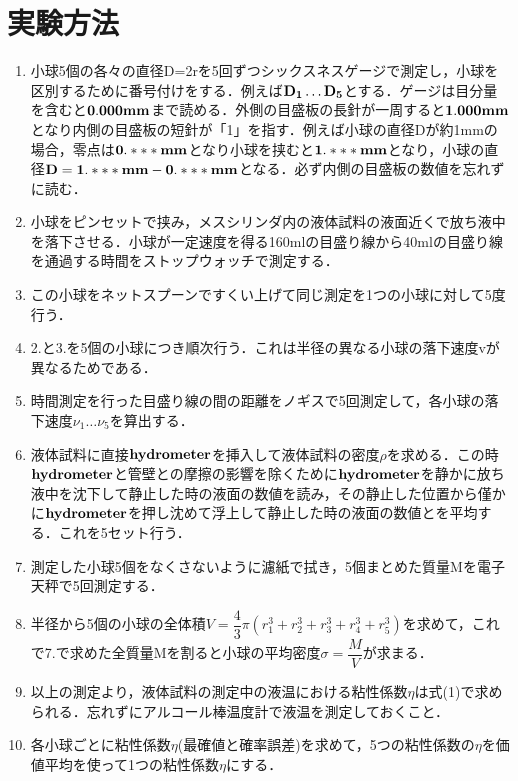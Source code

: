 \documentclass[a4paper,1pt]{jsarticle}
\begin{document}
\section{実験方法}



\begin{enumerate}
  \item 小球5個の各々の直径D=2rを5回ずつシックスネスゲージで測定し，小球を区別するために番号付けをする．例えば$\bold{D_1\dots D_5}$とする．ゲージは目分量を含むと$\bold{0.000mm}$まで読める．外側の目盛板の長針が一周すると$\bold{1.000mm}$となり内側の目盛板の短針が「1」を指す．例えば小球の直径Dが約1mmの場合，零点は$\bold{0.\ast \ast \ast mm}$となり小球を挟むと$\bold{1.\ast \ast \ast mm}$となり，小球の直径$\bold{D=1.\ast \ast \ast mm - 0.\ast \ast \ast mm}$となる．必ず内側の目盛板の数値を忘れずに読む．
  \item 小球をピンセットで挟み，メスシリンダ内の液体試料の液面近くで放ち液中を落下させる．小球が一定速度を得る160mlの目盛り線から40mlの目盛り線を通過する時間をストップウォッチで測定する．
  \item この小球をネットスプーンですくい上げて同じ測定を1つの小球に対して5度行う．
  \item 2.と3.を5個の小球につき順次行う．これは半径の異なる小球の落下速度vが異なるためである．
  \item 時間測定を行った目盛り線の間の距離をノギスで5回測定して，各小球の落下速度$\nu _1\dots \nu _5$を算出する．
  \item 液体試料に直接$\bold{hydrometer}$を挿入して液体試料の密度$\rho $を求める．この時$\bold{hydrometer}$と管壁との摩擦の影響を除くために$\bold{hydrometer}$を静かに放ち液中を沈下して静止した時の液面の数値を読み，その静止した位置から僅かに$\bold{hydrometer}$を押し沈めて浮上して静止した時の液面の数値とを平均する．これを5セット行う．
  \item 測定した小球5個をなくさないように濾紙で拭き，5個まとめた質量Mを電子天秤で5回測定する．
  \item 半径から5個の小球の全体積$V=\dfrac{4}{3}\pi (r_1^3+r_2^3+r_3^3+r_4^3+r_5^3)$を求めて，これで7.で求めた全質量Mを割ると小球の平均密度$\sigma = \dfrac{M}{V}$が求まる．
  \item 以上の測定より，液体試料の測定中の液温における粘性係数$\eta $は式(1)で求められる．忘れずにアルコール棒温度計で液温を測定しておくこと．
  \item 各小球ごとに粘性係数$\eta $(最確値と確率誤差)を求めて，5つの粘性係数の$\eta $を価値平均を使って1つの粘性係数$\eta $にする．
\end{enumerate}
\end{document}
